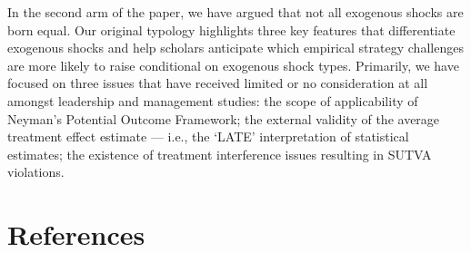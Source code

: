 \documentclass[11pt]{article}
\begin{document}
\begin{refsection}
In the second arm of the paper, we have argued that not all exogenous shocks are
born equal. Our original typology highlights three key features that 
differentiate exogenous shocks and help scholars anticipate which empirical 
strategy challenges are more likely to raise conditional on exogenous shock
types. Primarily, we have focused on three issues that have received 
limited or no consideration at all amongst leadership and management studies:
the scope of applicability of Neyman's Potential Outcome Framework; the 
external validity of the average treatment effect estimate --- i.e., the `LATE' 
interpretation of statistical estimates; the existence of treatment interference
issues resulting in SUTVA violations.


%
\section*{References}
\printbibliography[heading=none]
\end{refsection}
\end{document}
